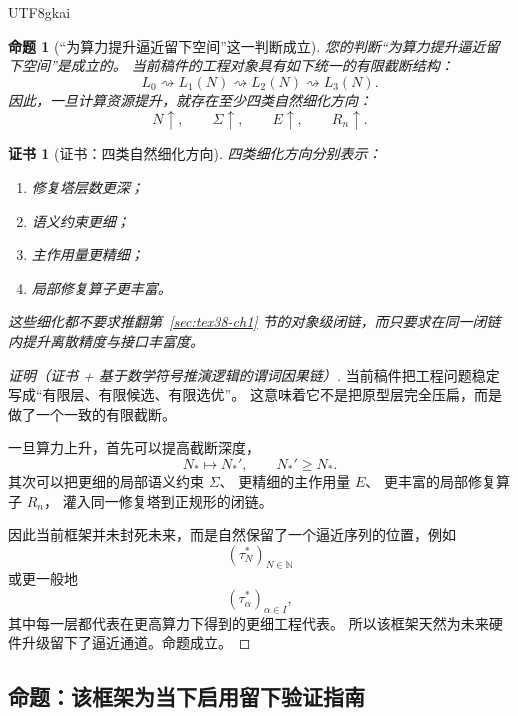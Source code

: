 \documentclass[12pt]{article}
\newtheorem{proposition}{命题}[section]
\newtheorem{Certificate}{证书}[section]
\newcommand{\NN}{\mathbb{N}}
\begin{document}
\begin{CJK*}{UTF8}{gkai}
\begin{proposition}[“为算力提升逼近留下空间”这一判断成立]
\label{prop:tex38-bridge-approx}
您的判断“为算力提升逼近留下空间”是成立的。
当前稿件的工程对象具有如下统一的有限截断结构：
\[
  L_0
  \rightsquigarrow
  L_1(N)
  \rightsquigarrow
  L_2(N)
  \rightsquigarrow
  L_3(N).
\]
因此，一旦计算资源提升，就存在至少四类自然细化方向：
\[
  N\uparrow,\qquad
  \Sigma\uparrow,\qquad
  E\uparrow,\qquad
  R_n\uparrow.
\]
\end{proposition}

\begin{Certificate}[证书：四类自然细化方向]
\label{cert:tex38-bridge-approx}
四类细化方向分别表示：
\begin{enumerate}
  \item 修复塔层数更深；
  \item 语义约束更细；
  \item 主作用量更精细；
  \item 局部修复算子更丰富。
\end{enumerate}
这些细化都不要求推翻第~\ref{sec:tex38-ch1} 节的对象级闭链，而只要求在同一闭链内提升离散精度与接口丰富度。
\end{Certificate}

\begin{proof}[证明（证书 + 基于数学符号推演逻辑的谓词因果链）]
当前稿件把工程问题稳定写成“有限层、有限候选、有限选优”。
这意味着它不是把原型层完全压扁，而是做了一个一致的有限截断。

一旦算力上升，首先可以提高截断深度，
\[
  N_\ast\mapsto N_\ast',
  \qquad
  N_\ast'\ge N_\ast.
\]
其次可以把更细的局部语义约束 $\Sigma$、
更精细的主作用量 $E$、
更丰富的局部修复算子 $R_n$，
灌入同一修复塔到正规形的闭链。

因此当前框架并未封死未来，而是自然保留了一个逼近序列的位置，例如
\[
  (\tau_N^\ast)_{N\in\NN}
\]
或更一般地
\[
  (\tau_\alpha^\ast)_{\alpha\in I},
\]
其中每一层都代表在更高算力下得到的更细工程代表。
所以该框架天然为未来硬件升级留下了逼近通道。命题成立。
\end{proof}

\subsection{命题：该框架为当下启用留下验证指南}
\label{subsec:tex38-bridge-prop-audit}


\end{CJK*}
\end{document}
